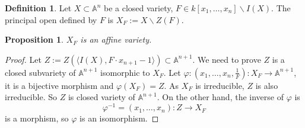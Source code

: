 \documentclass{amsart}
\theoremstyle{plain}
\newtheorem{proposition}{Proposition}
\theoremstyle{definition}
\newtheorem{definition}{Definition}
\theoremstyle{remark}
\numberwithin{equation}{section}
\begin{document}
\begin{definition}
	Let $ X\subset \mathbb{A}^n $ be a closed variety, $ F\in k[x_1,\dots,x_n]\backslash I(X) $. The principal open defined by $ F $ is $ X_F:=X\backslash Z(F) $.
\end{definition}
\begin{proposition}\label{14}
	$ X_F $ is an affine variety.
\end{proposition}
\begin{proof}
	Let $ Z:=Z(\langle I(X),F\cdot x_{n+1}-1\rangle )\subset \mathbb{A}^{n+1} $. We need to prove $ Z $ is a closed subvariety of $ \mathbb{A}^{n+1} $ isomorphic to $ X_F $. Let $ \varphi:(x_1,\dots,x_n,\frac{1}{F}):X_F\to \mathbb{A}^{n+1} $, it is a bijective morphism and $ \varphi(X_F)=Z $. As $ X_F $ is irreducible, $ Z $ is also irreducible. So $ Z $ is closed variety of $ \mathbb{A}^{n+1} $. On the other hand, the inverse of $ \varphi $ is
	$$
	\varphi^{-1}=(x_1,\dots,x_n):Z\to X_F
	$$
	is a morphism, so $ \varphi $ is an isomorphism.
\end{proof}
\end{document}
